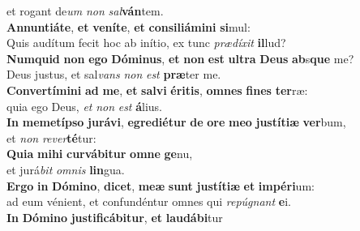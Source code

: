 \oddverse et rogant de\textit{um} \textit{non} \textit{sal}\textbf{ván}tem.\\
\evenverse \textbf{An}\textbf{nun}\textbf{ti}\textbf{á}\textbf{te}, \textbf{et} \textbf{ve}\textbf{ní}\textbf{te}, \textbf{et} \textbf{con}\textbf{si}\textbf{li}\textbf{á}\textbf{mi}\textbf{ni} \textbf{si}mul:~\*\\
\evenverse Quis audítum fecit hoc ab inítio, ex tunc \textit{præ}\textit{dí}\textit{xit} \textbf{il}lud?\\
\oddverse \textbf{Num}\textbf{quid} \textbf{non} \textbf{e}\textbf{go} \textbf{Dó}\textbf{mi}\textbf{nus}, \textbf{et} \textbf{non} \textbf{est} \textbf{ul}\textbf{tra} \textbf{De}\textbf{us} \textbf{ab}s\textbf{que} me?~\*\\
\oddverse Deus justus, et sal\textit{vans} \textit{non} \textit{est} \textbf{præ}ter me.\\
\evenverse \textbf{Con}\textbf{ver}\textbf{tí}\textbf{mi}\textbf{ni} \textbf{ad} \textbf{me}, \textbf{et} \textbf{sal}\textbf{vi} \textbf{é}\textbf{ri}\textbf{tis}, \textbf{om}\textbf{nes} \textbf{fi}\textbf{nes} \textbf{ter}ræ:~\*\\
\evenverse quia ego Deus, \textit{et} \textit{non} \textit{est} \textbf{á}lius.\\
\oddverse \textbf{In} \textbf{me}\textbf{me}\textbf{tí}\textbf{pso} \textbf{ju}\textbf{rá}\textbf{vi}, \textbf{e}\textbf{gre}\textbf{di}\textbf{é}\textbf{tur} \textbf{de} \textbf{o}\textbf{re} \textbf{me}\textbf{o} \textbf{ju}\textbf{stí}\textbf{ti}\textbf{æ} \textbf{ver}bum,~\*\\
\oddverse et \textit{non} \textit{re}\textit{ver}\textbf{té}tur:\\
\evenverse \textbf{Qui}\textbf{a} \textbf{mi}\textbf{hi} \textbf{cur}\textbf{vá}\textbf{bi}\textbf{tur} \textbf{om}\textbf{ne} \textbf{ge}nu,~\*\\
\evenverse et jurá\textit{bit} \textit{om}\textit{nis} \textbf{lin}gua.\\
\oddverse \textbf{Er}\textbf{go} \textbf{in} \textbf{Dó}\textbf{mi}\textbf{no}, \textbf{di}\textbf{cet}, \textbf{me}\textbf{æ} \textbf{sunt} \textbf{ju}\textbf{stí}\textbf{ti}\textbf{æ} \textbf{et} \textbf{im}\textbf{pé}\textbf{ri}um:~\*\\
\oddverse ad eum vénient, et confundéntur omnes qui \textit{re}\textit{pú}\textit{gnant} \textbf{e}i.\\
\evenverse \textbf{In} \textbf{Dó}\textbf{mi}\textbf{no} \textbf{ju}\textbf{sti}\textbf{fi}\textbf{cá}\textbf{bi}\textbf{tur}, \textbf{et} \textbf{lau}\textbf{dá}\textbf{bi}tur~\*\\
